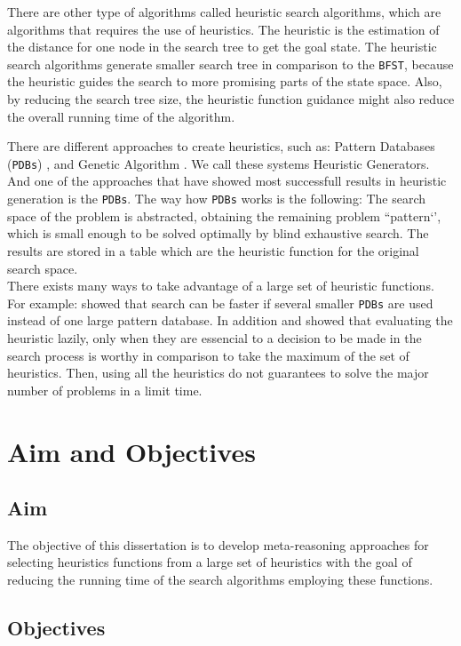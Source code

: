 There are other type of algorithms called heuristic search algorithms, which are algorithms that requires the use of heuristics. The heuristic is the estimation of the distance for one node in the search tree to get the goal state. The heuristic search algorithms generate smaller search tree in comparison to the \texttt{BFST}, because the heuristic guides the search to more promising parts of the state space. Also, by reducing the search tree size, the heuristic function guidance might also reduce the overall running time of the algorithm.

There are different approaches to create heuristics, such as: Pattern Databases (\texttt{PDBs}) \cite{haslum2007domain}, and Genetic Algorithm \cite{edelkamp2007automated}. We call these systems Heuristic Generators. And one of the approaches that have showed most successfull results in heuristic generation is the \texttt{PDBs}. The way how \texttt{PDBs} works is the following: The search space of the problem is abstracted, obtaining the remaining problem ``pattern‘’, which is small enough to be solved optimally by blind exhaustive search. The results are stored in a table which are the heuristic function for the original search space.\\

There exists many ways to take advantage of a large set of heuristic functions. For example: \cite{holte2006maximizing} showed that search can be faster if several smaller \texttt{PDBs} are used instead of one large pattern database. In addition \cite{domshlak2010max} and \cite{tolpin2013towards} showed that evaluating the heuristic lazily, only when they are essencial to a decision to be made in the search process is worthy in comparison to take the maximum of the set of heuristics. Then, using all the heuristics do not guarantees to solve the major number of problems in a limit time.
\section{Aim and Objectives}
\subsection{Aim}
\noindent
The objective of this dissertation is to develop meta-reasoning approaches for selecting heuristics functions from a large set of heuristics with the goal of reducing the running time of the search algorithms employing these functions.

\subsection{Objectives}
\noindent

